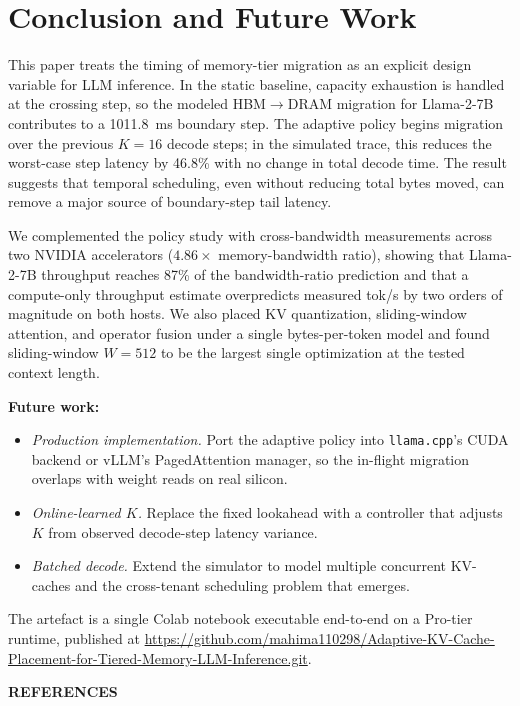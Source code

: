 \documentclass[conference]{IEEEtran}
\begin{document}
\section{Conclusion and Future Work}

This paper treats the timing of memory-tier migration as an explicit design variable for LLM inference. In the static baseline, capacity exhaustion is handled at the crossing step, so the modeled HBM$\rightarrow$DRAM migration for Llama-2-7B contributes to a 1011.8~ms boundary step. The adaptive policy begins migration over the previous $K=16$ decode steps; in the simulated trace, this reduces the worst-case step latency by 46.8\% with no change in total decode time. The result suggests that temporal scheduling, even without reducing total bytes moved, can remove a major source of boundary-step tail latency.

We complemented the policy study with cross-bandwidth measurements across two NVIDIA accelerators ($4.86\times$ memory-bandwidth ratio), showing that Llama-2-7B throughput reaches 87\% of the bandwidth-ratio prediction and that a compute-only throughput estimate overpredicts measured tok/s by two orders of magnitude on both hosts. We also placed KV quantization, sliding-window attention, and operator fusion under a single bytes-per-token model and found sliding-window $W=512$ to be the largest single optimization at the tested context length.

\textbf{Future work:}
\begin{itemize}
\item \emph{Production implementation.} Port the adaptive policy into \texttt{llama.cpp}'s CUDA backend or vLLM's PagedAttention manager, so the in-flight migration overlaps with weight reads on real silicon.
\item \emph{Online-learned $K$.} Replace the fixed lookahead with a controller that adjusts $K$ from observed decode-step latency variance.
\item \emph{Batched decode.} Extend the simulator to model multiple concurrent KV-caches and the cross-tenant scheduling problem that emerges.
\end{itemize}

The artefact is a single Colab notebook executable end-to-end on a Pro-tier runtime, published at \url{https://github.com/mahima110298/Adaptive-KV-Cache-Placement-for-Tiered-Memory-LLM-Inference.git}.

\textbf{REFERENCES}
\end{document}
